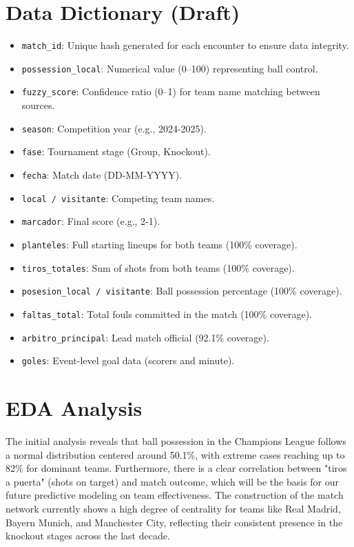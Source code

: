 \documentclass[12pt,a4paper]{article}
\begin{document}
\section{Data Dictionary (Draft)}
\begin{itemize}
    \item \texttt{match\_id}: Unique hash generated for each encounter to ensure data integrity.
    \item \texttt{possession\_local}: Numerical value (0--100) representing ball control.
    \item \texttt{fuzzy\_score}: Confidence ratio (0--1) for team name matching between sources.
    \item \texttt{season}: Competition year (e.g., 2024-2025).
    \item \texttt{fase}: Tournament stage (Group, Knockout).
    \item \texttt{fecha}: Match date (DD-MM-YYYY).
    \item \texttt{local / visitante}: Competing team names.
    \item \texttt{marcador}: Final score (e.g., 2-1).
    \item \texttt{planteles}: Full starting lineups for both teams (100\% coverage).
    \item \texttt{tiros\_totales}: Sum of shots from both teams (100\% coverage).
    \item \texttt{posesion\_local / visitante}: Ball possession percentage (100\% coverage).
    \item \texttt{faltas\_total}: Total fouls committed in the match (100\% coverage).
    \item \texttt{arbitro\_principal}: Lead match official (92.1\% coverage).
    \item \texttt{goles}: Event-level goal data (scorers and minute).
\end{itemize}

\appendix
\section{EDA Analysis}

The initial analysis reveals that ball possession in the Champions League follows a normal distribution centered around 50.1\%, with extreme cases reaching up to 82\% for dominant teams. Furthermore, there is a clear correlation between "tiros a puerta" (shots on target) and match outcome, which will be the basis for our future predictive modeling on team effectiveness. The construction of the match network currently shows a high degree of centrality for teams like Real Madrid, Bayern Munich, and Manchester City, reflecting their consistent presence in the knockout stages across the last decade.
\end{document}
